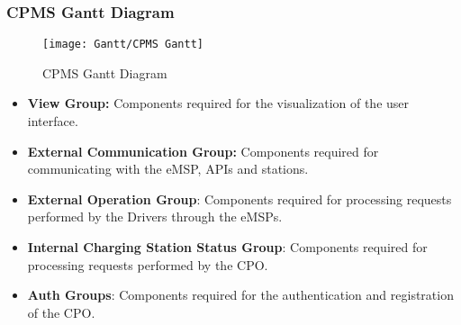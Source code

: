 \subsubsection{CPMS Gantt Diagram}
\begin{figure}[H]
    \begin{center}
    \texttt{[image: Gantt/CPMS Gantt]}
    \caption{CPMS Gantt Diagram}
    \label{fig:CPMSGantt}
    \end{center}
\end{figure}
\begin{itemize}
    \item \textbf{View Group:} Components required for the visualization of the user interface.
    \item \textbf{External Communication Group:} Components required for communicating with the eMSP, APIs and stations.
    \item \textbf{External Operation Group}: Components required for processing requests performed by the Drivers through the eMSPs.
    \item \textbf{Internal Charging Station Status Group}: Components required for processing requests performed by the CPO.
    \item \textbf{Auth Groups}: Components required for the authentication and registration of the CPO.
\end{itemize}
